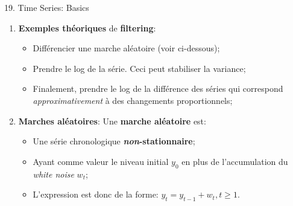 \documentclass[12pt, titlepage, french]{report}
\begin{document}
\begin{CHPT_SUMM}[label = {timeseries19}]{19. Time Series: Basics}
\begin{enumerate}
\begin{itemize}
		\texttt{[image: src/regime-change-wave.png]}
		\item	Cette idée d'observer des tendances dans des graphiques d'ondes sonores est exactement la même idée que le \textit{time series filtering};
		\item[]	On cherche à identifier des tendances, des cycles, des changements de régime, etc. dans une série qui peuvent sembler d'être aléatoires;
		\item	Dans le même ordre d'idée, lorsqu'un musicien joue son instrument on imagine que ce n'est pas parfait et qu'il y a un certain niveau d'erreur!
		\item[]	Ceci est donc le \textbf{white noise}, l'erreur aléatoire de la fréquence observée à la fréquence attendue;
		\item[]	Alors, pour néanmoins reconnaître une fréquence d'instrument imparfait, on alloue une variabilité (ou déviance) à la série \og parfaite \fg{};
		\item	La partie inexplicable par les patterns qui demeure est dite d'être \textbf{irréductible} et est donc traitée comme du \textbf{\textit{white noise}};
		\end{itemize}
	\item[]	\label{sec:ex_rand_walk} \textbf{Exemples théoriques} de \textbf{filtering}: 
		\begin{itemize}
		\item	Différencier une marche aléatoire (voir ci-dessous);
		\item	Prendre le log de la série. Ceci peut stabiliser la variance;
		\item	Finalement, prendre le log de la différence des séries qui correspond \textit{approximativement} à des changements proportionnels;
		\end{itemize}
	\item	\textbf{Marches aléatoires}: Une \textbf{marche aléatoire} est:
		\begin{itemize}
		\item	Une série chronologique \textbf{\textit{non}-stationnaire};
		\item	Ayant comme valeur le niveau initial $y_{0}$ en plus de l'accumulation du \textit{white noise} $w_{t}$;
		\item	L'expression est donc de la forme: $y_{t} = y_{t - 1} + w_{t}, t \ge 1$.
		\end{itemize}

\end{enumerate}
\end{CHPT_SUMM}
\end{document}
